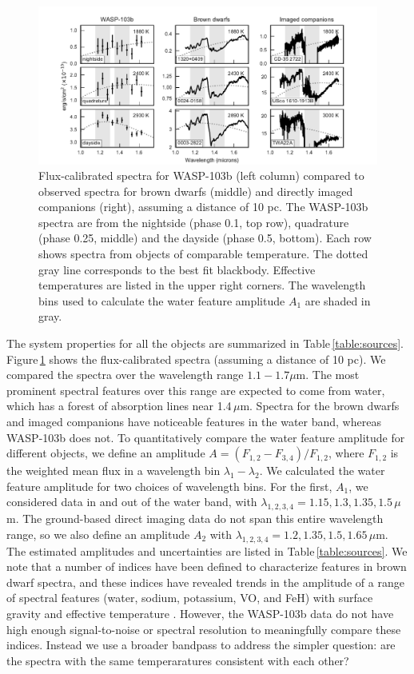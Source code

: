 \documentclass[twocolumn]{aastex61}
\begin{document}
\begin{figure}
\includegraphics[width = 1.0\textwidth]{fig16.pdf}
\caption{Flux-calibrated spectra for WASP-103b (left column) compared to observed spectra for brown dwarfs (middle) and directly imaged companions (right), assuming a distance of 10 pc. The WASP-103b spectra are from the nightside (phase 0.1, top row), quadrature (phase 0.25, middle) and the dayside (phase 0.5, bottom). Each row shows spectra from objects of comparable temperature. The dotted gray line corresponds to the best fit blackbody. Effective temperatures are listed in the upper right corners. The wavelength bins used to calculate the water feature amplitude $A_1$ are shaded in gray.}
\label{fig:planetstarcomparison}
\end{figure}

The system properties for all the objects are summarized in Table\,\ref{table:sources}.  Figure\,\ref{fig:planetstarcomparison} shows the flux-calibrated spectra (assuming a distance of 10 pc).  We compared the spectra over the wavelength range $1.1 - 1.7\mu$m. The most prominent spectral features over this range are expected to come from water, which has a forest of absorption lines near 1.4\,$\mu$m. Spectra for the brown dwarfs and imaged companions have noticeable features in the water band, whereas WASP-103b does not. To quantitatively compare the water feature amplitude for different objects, we define an amplitude $A = (F_{1,2} - F_{3,4})/F_{1,2}$, where $F_{1,2}$ is the weighted mean flux in a wavelength bin $\lambda_1 - \lambda_2$. We calculated the water feature amplitude for two choices of wavelength bins. For the first, $A_1$, we considered data in and out of the water band, with $\lambda_{1,2,3,4} = 1.15, 1.3, 1.35, 1.5\,\mu$m. The ground-based direct imaging data do not span this entire wavelength range, so we also define an amplitude $A_2$ with $\lambda_{1,2,3,4} = 1.2, 1.35, 1.5, 1.65\,\mu$m. The estimated amplitudes and uncertainties are listed in Table\,\ref{table:sources}. We note that a number of indices have been defined to characterize features in brown dwarf spectra, and these indices have revealed trends in the amplitude of a range of spectral features (water, sodium, potassium, VO, and FeH) with surface gravity and effective temperature \citep{reid01,geballe02,mclean03}. However, the WASP-103b data do not have high enough signal-to-noise or spectral resolution to meaningfully compare these indices. Instead we use a broader bandpass to address the simpler question: are the spectra with the same temperaratures consistent with each other?
 
\end{document}
